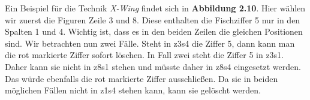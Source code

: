 \noindent Ein Beispiel für die Technik \textit{X-Wing} findet sich in \textbf{Abbildung 2.10}. Hier wählen wir zuerst die Figuren Zeile 3 und 8. Diese enthalten die Fischziffer 5 nur in den Spalten 1 und 4. Wichtig ist, dass es in den beiden Zeilen die gleichen Positionen sind. Wir betrachten nun zwei Fälle. Steht in z3s4 die Ziffer 5, dann kann man die rot markierte Ziffer sofort löschen. In Fall zwei steht die Ziffer 5 in z3s1. Daher kann sie nicht in z8s1 stehen und müsste daher in z8s4 eingesetzt werden. Das würde ebenfalls die rot markierte Ziffer ausschließen. Da sie in beiden möglichen Fällen nicht in z1s4 stehen kann, kann sie gelöscht werden.